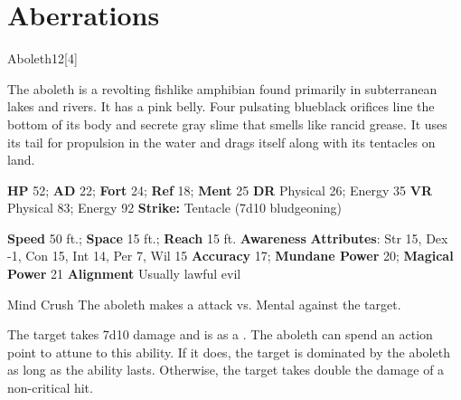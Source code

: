 
        \section{Aberrations}
      
  \begin{monsection}{Aboleth}{12}[4]
    \vspace{-1em}\vspace{-1em}
    \vspace{0em}

    
    The aboleth is a revolting fishlike amphibian found primarily in subterranean lakes and rivers.
    It has a pink belly.
    Four pulsating blueblack orifices line the bottom of its body and secrete gray slime that smells like rancid grease.
    It uses its tail for propulsion in the water and drags itself along with its tentacles on land.
  
    

    \begin{spellcontent}
      \begin{spelltargetinginfo}
        \pari \textbf{HP} 52;
          \textbf{AD} 22;
          \textbf{Fort} 24;
          \textbf{Ref} 18;
          \textbf{Ment} 25
        \pari \textbf{DR} Physical 26; Energy 35
        \pari \textbf{VR} Physical 83; Energy 92
        \pari \textbf{Strike:}
            Tentacle  (7d10 bludgeoning)
      \end{spelltargetinginfo}
    \end{spellcontent}
    \begin{monsterfooter}
      \pari \textbf{Speed} 50 ft.;
        \textbf{Space} 15 ft.;
        \textbf{Reach} 15 ft.
      \pari \textbf{Awareness} 
      \pari \textbf{Attributes}:
        Str 15, Dex -1,
        Con 15, Int 14,
        Per 7, Wil 15
      \pari \textbf{Accuracy} 17;
        \textbf{Mundane Power} 20;
      \textbf{Magical Power} 21
      \pari \textbf{Alignment} Usually lawful evil
    \end{monsterfooter}
  \end{monsection}
  \begin{freeability}{Mind Crush}
       The aboleth makes a  attack
        vs. Mental against the target.
    
    \hit The target takes 7d10  damage and is  as a .
    \crit 
          The aboleth can spend an action point to attune to this ability.
          If it does, the target is dominated by the aboleth as long as the ability lasts.
          Otherwise, the target takes double the damage of a non-critical hit.
    \end{freeability}
  

